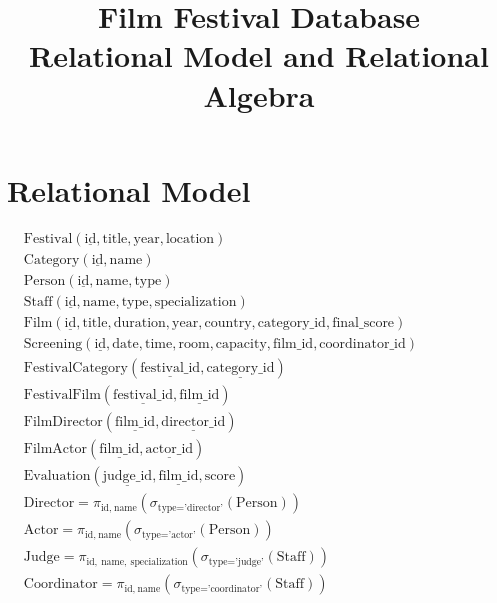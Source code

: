 \documentclass[12pt]{article}
\begin{document}
\title{Film Festival Database\\Relational Model and Relational Algebra}
\author{}
\date{}

\maketitle

\section{Relational Model}

\vspace{5mm}
\hspace{1cm}
{\large
$
\begin{aligned}
&\text{Festival}(\underline{\text{id}}, \text{title}, \text{year}, \text{location})\\[4pt]
&\text{Category}(\underline{\text{id}}, \text{name})\\[4pt]
&\text{Person}(\underline{\text{id}}, \text{name}, \text{type})\\[4pt]
&\text{Staff}(\underline{\text{id}}, \text{name}, \text{type}, \text{specialization})\\[4pt]
&\text{Film}(\underline{\text{id}}, \text{title}, \text{duration}, \text{year}, \text{country}, \text{category\_id}, \text{final\_score})\\[4pt]
&\text{Screening}(\underline{\text{id}}, \text{date}, \text{time}, \text{room}, \text{capacity}, \text{film\_id}, \text{coordinator\_id})\\[4pt]
&\text{FestivalCategory}(\underline{\text{festival\_id}}, \underline{\text{category\_id}})\\[4pt]
&\text{FestivalFilm}(\underline{\text{festival\_id}}, \underline{\text{film\_id}})\\[4pt]
&\text{FilmDirector}(\underline{\text{film\_id}}, \underline{\text{director\_id}})\\[4pt]
&\text{FilmActor}(\underline{\text{film\_id}}, \underline{\text{actor\_id}})\\[4pt]
&\text{Evaluation}(\underline{\text{judge\_id}}, \underline{\text{film\_id}}, \text{score})\\[8pt]
&\text{Director} = \pi_{\text{id},\ \text{name}}(\sigma_{\text{type}=\text{'director'}}(\text{Person}))\\[4pt]
&\text{Actor} = \pi_{\text{id},\ \text{name}}(\sigma_{\text{type}=\text{'actor'}}(\text{Person}))\\[4pt]
&\text{Judge} = \pi_{\text{id},\ \text{name},\ \text{specialization}}(\sigma_{\text{type}=\text{'judge'}}(\text{Staff}))\\[4pt]
&\text{Coordinator} = \pi_{\text{id},\ \text{name}}(\sigma_{\text{type}=\text{'coordinator'}}(\text{Staff}))
\end{aligned}
$
}
\end{document}
